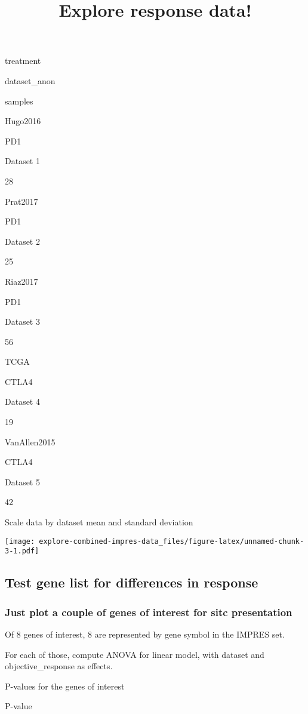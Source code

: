 \documentclass[]{article}
\title{Explore response data!}
\author{}
\date{}
\begin{document}
\maketitle

{
\setcounter{tocdepth}{2}
\tableofcontents
}
treatment

dataset\_anon

samples

Hugo2016

PD1

Dataset 1

28

Prat2017

PD1

Dataset 2

25

Riaz2017

PD1

Dataset 3

56

TCGA

CTLA4

Dataset 4

19

VanAllen2015

CTLA4

Dataset 5

42

Scale data by dataset mean and standard deviation

\texttt{[image: explore-combined-impres-data\_files/figure-latex/unnamed-chunk-3-1.pdf]}

\subsection{Test gene list for differences in
response}\label{test-gene-list-for-differences-in-response}

\subsubsection{Just plot a couple of genes of interest for sitc
presentation}\label{just-plot-a-couple-of-genes-of-interest-for-sitc-presentation}

Of 8 genes of interest, 8 are represented by gene symbol in the IMPRES
set.

For each of those, compute ANOVA for linear model, with dataset and
objective\_response as effects.

P-values for the genes of interest

P-value
\end{document}
